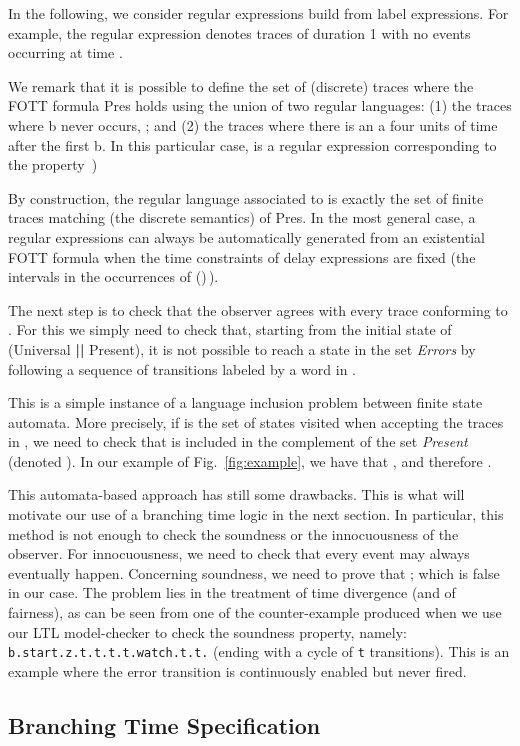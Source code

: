 \documentclass[a4paper]{scrartcl}
\def\code#1{\textsf{\small\bfseries #1}}
\def\vars#1{\textsf{\small #1}}
\newcommand{\ltl}[1]{\texttt{#1}}
\begin{document}
In the following, we consider regular expressions build from label
expressions. For example, the regular expression
 denotes traces of
duration 1 with no events occurring at time .

We remark that it is possible to define the set of (discrete) traces
where the FOTT formula {Pres} holds using the union of two regular
languages: (1) the traces where \vars{b} never occurs, ; and (2) the traces where there is an
\vars{a} four units of time after the first \vars{b}. In this
particular case,  is a regular expression corresponding to the
property \,)

By construction, the regular language associated to  is
exactly the set of finite traces matching (the discrete semantics) of
Pres.  In the most general case, a regular expressions can always be
automatically generated from an existential FOTT formula when the time
constraints of delay expressions are fixed (the intervals  in the
occurrences of ()\,).

The next step is to check that the observer agrees with every trace
conforming to . For this we simply need to check that, starting
from the initial state of (\vars{Universal} \code{||} \vars{Present}),
it is not possible to reach a state in the set \emph{Errors} by
following a sequence of transitions labeled by a word in . 

This is a simple instance of a language inclusion problem between
finite state automata. More precisely, if  is the
set of states visited when accepting the traces in , we
need to check that  is included in the complement of
the set \emph{Present} (denoted ). In our
example of Fig.~\ref{fig:example}, we have that
, and therefore
.

This automata-based approach has still some drawbacks. This is what
will motivate our use of a branching time logic in the next
section. In particular, this method is not enough to check the
soundness or the innocuousness of the observer. For innocuousness, we
need to check that every event may always eventually
happen. Concerning soundness, we need to prove that ; which is false in our case.
The problem lies in the treatment of time divergence (and of
fairness), as can be seen from one of the counter-example produced
when we use our LTL model-checker to check the soundness property,
namely: \ltl{b.start.z.t.t.t.t.watch.t.t.} (ending with a
cycle of \texttt{t} transitions). This is an example where the error
transition is continuously enabled but never fired.

\subsection{Branching Time Specification} 
\end{document}
